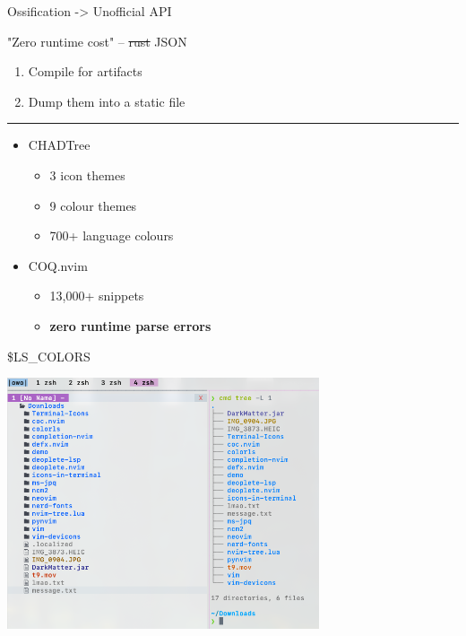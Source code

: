 \documentclass{beamer}
\begin{document}
\begin{frame}{Ossification -> Unofficial API}

	"Zero runtime cost" -- \st{rust} JSON

	\begin{enumerate}

		\item Compile  for artifacts

		\item Dump them into a static file

	\end{enumerate}

	\rule{\textwidth}{0.1em}

	\begin{itemize}

		\item CHADTree

		      \begin{itemize}

			      \item 3 icon themes

			      \item 9 colour themes

			      \item 700+ language colours

		      \end{itemize}

		\item COQ.nvim

		      \begin{itemize}

			      \item 13,000+ snippets

			      \item \textbf{zero runtime parse errors}

		      \end{itemize}

	\end{itemize}

\end{frame}


\begin{frame}{\$LS\_COLORS}

	\includegraphics[width=\textwidth,height=20em]{chadtree_ls}

\end{frame}
\end{document}
